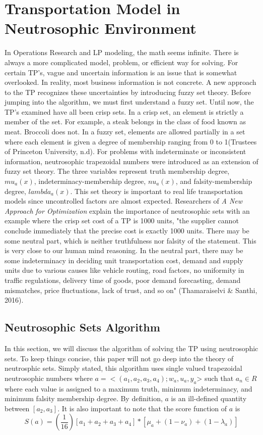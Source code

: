 \documentclass{article}
\begin{document}
\section{Transportation Model in Neutrosophic Environment}

In Operations Research and LP modeling, the math seems infinite. There is always a more complicated model, problem, or efficient way for solving. For certain TP's, vague and uncertain information is an issue that is somewhat overlooked. In reality, most business information is not concrete. A new approach to the TP recognizes these uncertainties by introducing fuzzy set theory. Before jumping into the algorithm, we must first understand a fuzzy set. Until now, the TP's examined have all been crisp sets. In a crisp set, an element is strictly a member of the set. For example, a steak belongs in the class of food known as meat. Broccoli does not. In a fuzzy set, elements are allowed partially in a set where each element is given a degree of membership ranging from 0 to 1(Trustees of Princeton University, n.d). For problems with indeterminate or inconsistent information, neutrosophic trapezoidal numbers were introduced as an extension of fuzzy set theory. The three variables represent truth membership degree, $mu_a(x)$, indeterminacy-membership degree, $nu_a(x)$, and falsity-membership degree, $lambda_a(x)$. This set theory is important to real life transportation models since uncontrolled factors are almost expected. Researchers of \emph{A New Approach for Optimization} explain the importance of neutrosophic sets with an example where the crisp set cost of a TP is 1000 units, "the supplier cannot conclude immediately that the precise cost is exactly 1000 units. There may be some neutral part, which is neither truthfulness nor falsity of the statement. This is very close to our human mind reasoning. In the neutral part, there may be some indeterminacy in deciding unit transportation cost, demand and supply units due to various causes like vehicle routing, road factors, no uniformity in traffic regulations, delivery time of goods, poor demand forecasting, demand mismatches, price fluctuations, lack of trust, and so on" (Thamaraiselvi & Santhi, 2016). 

\subsection{Neutrosophic Sets Algorithm}
In this section, we will discuss the algorithm of solving the TP using neutrosophic sets. To keep things concise, this paper will not go deep into the theory of neutrosphic sets. Simply stated, this algorithm uses single valued trapezoidal neutrosophic numbers where $a=<(a_1,a_2,a_3,a_4); w_a,u_a,y_a$> such that $a_n \in R$ where each value is assigned to a maximum truth, minimum indeterminacy, and minimum falsity membership degree. By definition, $a$ is an ill-defined quantity between $[a_2,a_3]$. It is also important to note that the score function of $a$ is 
\begin{equation}
    S(a)=(\frac{1}{16})[a_1+a_2+a_3+a_4]*[\mu_a+(1-\nu_a)+(1-\lambda_a)]
\end{equation}
\end{document}
